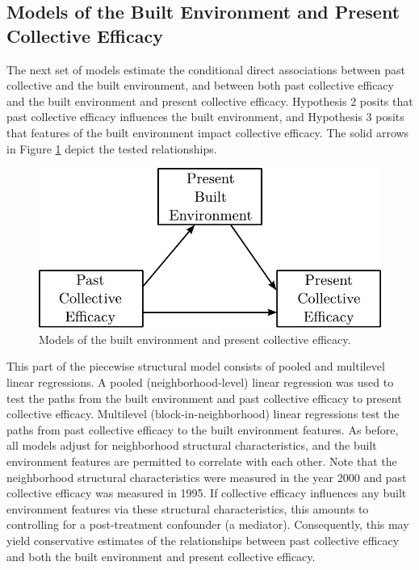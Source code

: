 \documentclass [11pt, proquest] {uwthesis}[2015/03/03]
\begin{document}
\hypertarget{models-of-the-built-environment-and-present-collective-efficacy}{%
\subsection{Models of the Built Environment and Present Collective Efficacy}\label{models-of-the-built-environment-and-present-collective-efficacy}}

The next set of models estimate the conditional direct associations between past collective and the built environment, and between both past collective efficacy and the built environment and present collective efficacy. Hypothesis 2 posits that past collective efficacy influences the built environment, and Hypothesis 3 posits that features of the built environment impact collective efficacy. The solid arrows in Figure \ref{fig:cebemodel} depict the tested relationships.\linebreak
\linebreak
\begin{figure}

{\centering \includegraphics[width=0.75\linewidth]{./figure/ch2/ce_be_model} 

}

\caption{Models of the built environment and present collective efficacy.}\label{fig:cebemodel}
\end{figure}
This part of the piecewise structural model consists of pooled and multilevel linear regressions. A pooled (neighborhood-level) linear regression was used to test the paths from the built environment and past collective efficacy to present collective efficacy. Multilevel (block-in-neighborhood) linear regressions test the paths from past collective efficacy to the built environment features. As before, all models adjust for neighborhood structural characteristics, and the built environment features are permitted to correlate with each other. Note that the neighborhood structural characteristics were measured in the year 2000 and past collective efficacy was measured in 1995. If collective efficacy influences any built environment features via these structural characteristics, this amounts to controlling for a post-treatment confounder (a mediator). Consequently, this may yield conservative estimates of the relationships between past collective efficacy and both the built environment and present collective efficacy.
\end{document}
